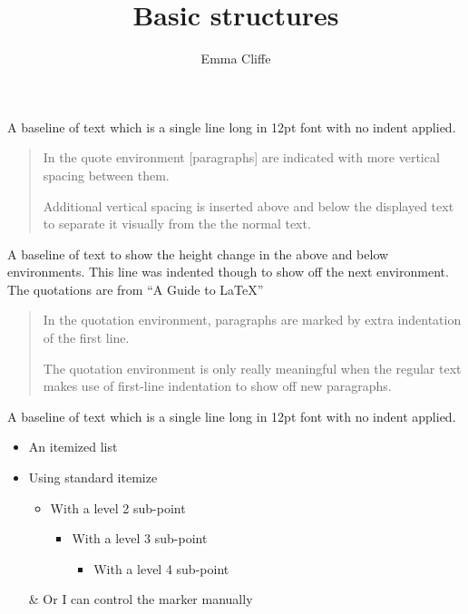 \newtheorem{theorem}{Theorem}[section]
\usepackage{longtable} 
\title{Basic structures}
\author{Emma Cliffe}
\date{}
\usepackage{calc}
\usepackage{longtable}
\usepackage{tabu}
\usepackage{breqn}
\setlength{\arraycolsep}{0.800000em}
\renewcommand{\arraystretch}{1.400000}

\renewcommand{\baselinestretch}{1.250000}
\selectfont
\setlength{\parskip}{1.0\baselineskip}

\maketitle
\noindent
A baseline of text which is a single line long in 12pt font with no indent applied.

\begin{quote}
In the quote environment [paragraphs] are indicated with more vertical spacing between them. 

Additional vertical spacing is inserted above and below the displayed text to separate it visually from the the normal text.
\end{quote}

A baseline of text to show the height change in the above and below environments. This line was indented though to show off the next environment. The quotations are from ``A Guide to \LaTeX'' \cite{KopkaDaly}

\begin{quotation}
In the quotation environment, paragraphs are marked by extra indentation of the first line. 

The quotation environment is only really meaningful when the regular text makes use of first-line indentation to show off new paragraphs.
\end{quotation}


\noindent
A baseline of text which is a single line long in 12pt font with no indent applied.

\begin{itemize}
\item An itemized list
\item Using standard itemize
\begin{itemize}
\item With a level 2 sub-point
\begin{itemize}
\item With a level 3 sub-point
\begin{itemize}
\item With a level 4 sub-point
\end{itemize}
\end{itemize}
\end{itemize}
\item[\&] Or I can control the marker manually
\end{itemize}

